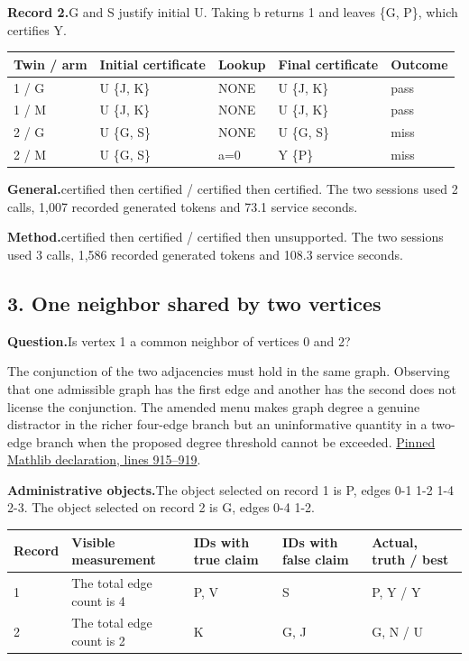 \documentclass[12pt,letterpaper]{article}
\newcommand{\dossier}[2]{\clearpage\subsection*{#1}\phantomsection\label{#2}}
\newcommand{\reading}[2]{\par\smallskip\textsf{\color{accent}\bfseries #1}\enspace #2\par}
\begin{document}
\reading{Record 2.}{G and S justify initial U. Taking b returns 1 and leaves \{G, P\}, which certifies Y.}

\begin{center}\footnotesize\setlength{\tabcolsep}{4pt}\begin{tabularx}{\linewidth}{lYlYl}\toprule
Twin / arm & Initial certificate & Lookup & Final certificate & Outcome\\ / G & U \{J, K\} & NONE & U \{J, K\} & pass\\
1 / M & U \{J, K\} & NONE & U \{J, K\} & pass\\
2 / G & U \{G, S\} & NONE & U \{G, S\} & miss\\
2 / M & U \{G, S\} & a=0 & Y \{P\} & miss\\
\bottomrule\end{tabularx}\end{center}


\reading{General.}{certified then certified / certified then certified. The two sessions used 2 calls, 1,007 recorded generated tokens and 73.1 service seconds.}

\reading{Method.}{certified then certified / certified then unsupported. The two sessions used 3 calls, 1,586 recorded generated tokens and 108.3 service seconds.}

\dossier{3. One neighbor shared by two vertices}{case3}

\reading{Question.}{Is vertex 1 a common neighbor of vertices 0 and 2?}

The conjunction of the two adjacencies must hold in the same graph. Observing that one admissible graph has the first edge and another has the second does not license the conjunction. The amended menu makes graph degree a genuine distractor in the richer four-edge branch but an uninformative quantity in a two-edge branch when the proposed degree threshold cannot be exceeded. \href{https://github.com/leanprover-community/mathlib4/blob/0df444a360eaa60ab8c11dca51a86af692955474/Mathlib/Combinatorics/SimpleGraph/Basic.lean#L915-L919}{Pinned Mathlib declaration, lines 915--919}.

\reading{Administrative objects.}{The object selected on record 1 is P, edges 0-1 1-2 1-4 2-3. The object selected on record 2 is G, edges 0-4 1-2.}

\begin{center}\footnotesize\setlength{\tabcolsep}{4pt}\begin{tabularx}{\linewidth}{lYYYl}\toprule
Record & Visible measurement & IDs with true claim & IDs with false claim & Actual, truth / best\\ & The total edge count is 4 & P, V & S & P, Y / Y\\
2 & The total edge count is 2 & K & G, J & G, N / U\\
\bottomrule\end{tabularx}\end{center}
\end{document}
